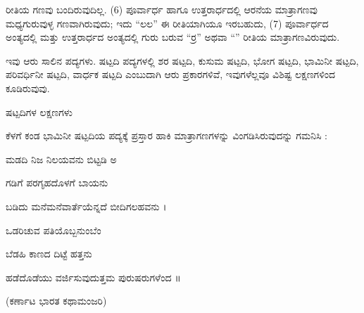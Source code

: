 \indent ರೀತಿಯ ಗಣವು ಬಂದಿರುವುದಿಲ್ಲ. (6) ಪೂರ್ವಾರ್ಧ ಹಾಗೂ ಉತ್ತರಾರ್ಧದಲ್ಲಿ ಆರನೆಯ ಮಾತ್ರಾಗಣವು ಮಧ್ಯಗುರುವುಳ್ಳ ಗಣವಾಗಿರುವುದು; ಇದು “ಲಲ” ಈ ರೀತಿಯಾಗಿಯೂ ಇರಬಹುದು, (7) ಪೂರ್ವಾರ್ಧದ ಅಂತ್ಯದಲ್ಲಿ ಮತ್ತು ಉತ್ತರಾರ್ಧದ ಅಂತ್ಯದಲ್ಲಿ ಗುರು ಬರುವ “ರ್ರ” ಅಥವಾ “\guru{}\guru{}” ರೀತಿಯ ಮಾತ್ರಾಗಣವಿರುವುದು.\par

\vspace{4pt plus 4pt minus 1pt}\hspace{0.5em}ಇವು ಆರು ಸಾಲಿನ ಪದ್ಯಗಳು. ಷಟ್ಪದಿ ಪದ್ಯಗಳಲ್ಲಿ ಶರ ಷಟ್ಪದಿ, ಕುಸುಮ ಷಟ್ಪದಿ, ಭೋಗ ಷಟ್ಪದಿ, ಭಾಮಿನೀ ಷಟ್ಪದಿ, ಪರಿವರ್ಧಿನೀ ಷಟ್ಪದಿ, ವಾರ್ಧಕ ಷಟ್ಪದಿ ಎಂಬುದಾಗಿ ಆರು ಪ್ರಕಾರಗಳಿವೆ, ಇವುಗಳೆಲ್ಲವೂ ವಿಶಿಷ್ಟ ಲಕ್ಷಣಗಳಿಂದ ಕೂಡಿರುವುವು.\par

\indent ಷಟ್ಪದಿಗಳ ಲಕ್ಷಣಗಳು\par

\begin{kbvrule}
\noindent\kbvbullet\hspace{0.5em}ಕೆಳಗೆ ಕಂಡ ಭಾಮಿನೀ ಷಟ್ಪದಿಯ ಪದ್ಯಕ್ಕೆ ಪ್ರಸ್ತಾರ ಹಾಕಿ ಮಾತ್ರಾಗಣಗಳನ್ನು ವಿಂಗಡಿಸಿರುವುದನ್ನು ಗಮನಿಸಿ :
\end{kbvrule}

\indent \laghu{}\laghu{} \laghu{}\laghu{} \laghu{}\laghu{} \laghu{} \laghu{}\laghu{} \guru{}\laghu{}\laghu{} ಮಡದಿ ನಿಜ ನಿಲಯವನು ಬಿಟ್ಟಡಿ ಅ\par

\indent \laghu{}\laghu{} \laghu{}\laghu{} \laghu{}\laghu{}\laghu{}\laghu{}\laghu{} \guru{} \laghu{}\laghu{} ಗಡಿಗೆ ಪರಗೃಹದೊಳಗೆ ಬಾಯನು\par

\indent \laghu{}\laghu{}\laghu{}\laghu{} \laghu{}\laghu{}\laghu{}\laghu{}\guru{}\laghu{}\guru{}\laghu{}\laghu{}\guru{}\laghu{}\laghu{}\laghu{} \laghu{}\laghu{}\guru{}\par

\begin{kbvverse}
\noindent ಬಡಿದು ಮನೆಮನೆವಾರ್ತೆಯೆನ್ನದೆ ಬೀದಿಗಲಹವನು ।
\end{kbvverse}

\indent \laghu{}\laghu{}\laghu{}\laghu{} \laghu{}\laghu{}\laghu{}\laghu{}\guru{}\laghu{}\guru{}\guru{} ಒಡರಿಚುವ ಪತಿಯೊಬ್ಬನುಂಬೆಂ\par

\indent \laghu{}\laghu{}\laghu{} \guru{}\laghu{}\laghu{} \guru{}\laghu{} \guru{}\laghu{}\laghu{} ಬೆಡಹಿ ಕಾಣದ ದಿಟ್ಟೆ ಹತ್ತನು\par

\indent \laghu{}\laghu{}\laghu{} \laghu{}\laghu{} \guru{}\laghu{} \laghu{}\laghu{}\guru{}\laghu{}\laghu{} \laghu{}\laghu{}\laghu{}\laghu{}\guru{} \guru{}\par

\begin{kbvverse}
\noindent ಹಡೆದೊಡೆಯು ವರ್ಜಿಸುವುದುತ್ತಮ ಪುರುಷರುಗಳೆಂದ ॥
\end{kbvverse}

\indent (ಕರ್ಣಾಟ ಭಾರತ ಕಥಾಮಂಜರಿ)\par
